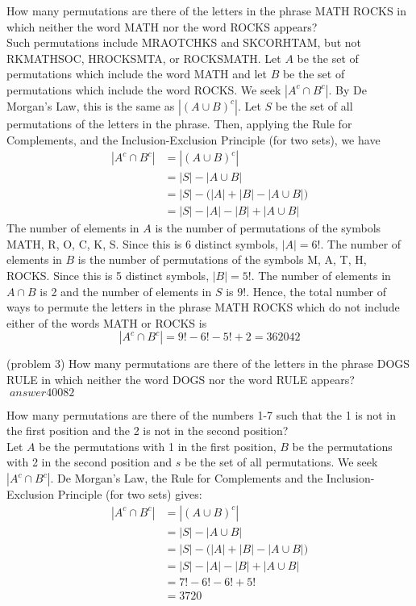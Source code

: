 \documentclass[handout]{ximera}
\begin{document}
\begin{example}[example 3]
How many permutations are there of the letters in the phrase MATH ROCKS in which neither 
the word MATH nor the word ROCKS appears?\\
Such permutations include MRAOTCHKS and SKCORHTAM, but not RKMATHSOC, HROCKSMTA, or ROCKSMATH.
Let $A$ be the set of permutations which include the word MATH and let $B$ be the set of permutations which include the word
ROCKS.  We seek $|A^c \cap B^c|$. By De Morgan's Law, this is the same as $|(A \cup B)^c|$. 
Let $S$ be the set of all permutations of the letters in the phrase. Then, applying the Rule for Complements,
and the Inclusion-Exclusion Principle (for two sets), we have
\begin{align*}
|A^c \cap B^c| &= |(A \cup B)^c|\\
               &= |S| - |A\cup B|\\
               &= |S| - \Big(|A| + |B| - |A\cup B|\Big)\\
               &= |S| - |A| - |B| + |A\cup B|
\end{align*}
The number of elements in $A$ is the number of permutations of the symbols MATH, R, O, C, K, S.  
Since this is 6 distinct symbols, $|A| = 6!$. The number of elements in $B$ is the number of 
permutations of the symbols M, A, T, H, ROCKS.  
Since this is 5 distinct symbols, $|B| = 5!$. The number of elements in $A \cap B$ is 2 and the number of elements in $S$
is $9!$. Hence, the total number of ways to permute the letters in the phrase MATH ROCKS which do not 
include either of the words MATH or ROCKS is
\[
|A^c \cap B^c| = 9! - 6! - 5! + 2 = 362042
\]
\end{example}


\begin{problem}(problem 3)
How many permutations are there of the letters in the phrase DOGS RULE in which neither 
the word DOGS nor the word RULE appears? $\; answer{40082}$
\end{problem}

\begin{example}[example 4]
How many permutations are there of the numbers 1-7 such that the 1 is not in the first 
position and the 2 is not in the second position?\\
Let $A$ be the permutations with 1 in the first position, $B$ be the permutations with 2 in the 
second position and $s$ be the set of all permutations. We seek $|A^c \cap B^c|$. 
De Morgan's Law, the Rule for Complements and the Inclusion-Exclusion Principle (for two sets) gives:
\begin{align*}
|A^c \cap B^c| &= |(A \cup B)^c|\\
               &= |S| - |A\cup B|\\
               &= |S| - \Big(|A| + |B| - |A\cup B|\Big)\\
               &= |S| - |A| - |B| + |A\cup B|\\
               &= 7! - 6! - 6! + 5!\\
               &= 3720
\end{align*}

\end{example}
\end{document}
